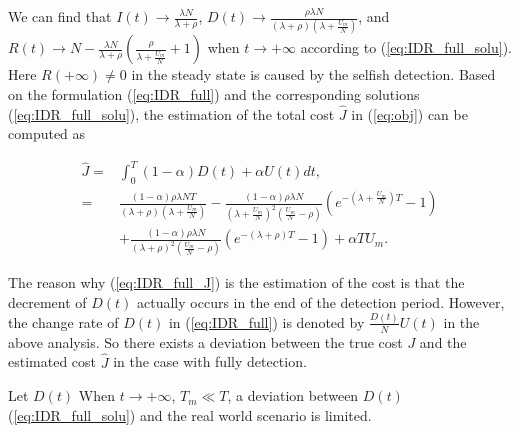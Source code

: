 We can find that $I(t) \rightarrow \frac{ \lambda N }{ \lambda + \rho }$,
$D(t) \rightarrow \frac{ \rho \lambda N }{ (\lambda + \rho)(\lambda + \frac{U_{m}}{N}) }$,
and $R(t) \rightarrow  N - \frac{ \lambda N }{ \lambda + \rho } \left( \frac{\rho}{\lambda + \frac{U_{m}}{N}} + 1 \right)$
when $t \rightarrow +\infty$ according to (\ref{eq:IDR_full_solu}).
Here $R(+\infty) \neq 0$ in the steady state is caused by the selfish detection.
Based on the formulation (\ref{eq:IDR_full}) and the corresponding solutions (\ref{eq:IDR_full_solu}),
the estimation of the total cost $\hat{J}$ in (\ref{eq:obj})
can be computed as
\begin{small}
\begin{equation}
\label{eq:IDR_full_J}
\begin{aligned}
\hat{J} =& \int_{0}^{T} (1-\alpha) D(t) + \alpha U(t) dt, \\
=& \frac{ (1-\alpha) \rho \lambda N T }{ (\lambda + \rho)(\lambda + \frac{U_{m}}{N}) }
- \frac{(1-\alpha) \rho \lambda N}{ {(\lambda + \frac{U_{m}}{N})}^{2} (\frac{U_{m}}{N} - \rho)}
(e^{-(\lambda + \frac{U_{m}}{N})T} - 1 ) \\
&+ \frac{(1-\alpha) \rho \lambda N }{ {(\lambda + \rho)}^{2} (\frac{U_{m}}{N} - \rho) }
(e^{-(\lambda + \rho)T} - 1 )
+ \alpha T U_{m}.
\end{aligned}
\end{equation}
\end{small}
The reason why (\ref{eq:IDR_full_J}) is the estimation of the cost
is that
the decrement of $D(t)$ actually occurs in the end of the detection period.
However, the change rate of $D(t)$ in (\ref{eq:IDR_full})
is denoted by $\frac{D(t)}{N}U(t)$ in the above analysis.
So there exists a deviation between the true cost $J$ and the estimated cost $\hat{J}$
in the case with fully detection.
\begin{lem}
Let $D(t)$
When $t \rightarrow +\infty$, $T_{m} \ll T$,
a deviation between $D(t)$ (\ref{eq:IDR_full_solu}) 
and the real world scenario is limited.
\end{lem}

